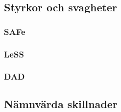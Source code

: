 	
	\subsection{Styrkor och svagheter}
	
	\subsubsection{SAFe}
		
	
	\subsubsection{LeSS}
	
	\subsubsection{DAD}
	
	\subsection{Nämnvärda skillnader}